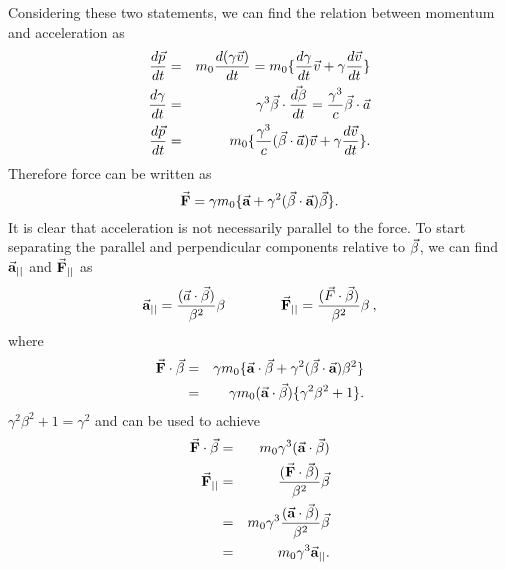 \documentclass{article}
\begin{document}
Considering these two statements, we can find the relation between momentum and acceleration as 
\begin{eqnarray}
    \frac{d \vec{p}}{d t} &=& m_0 \frac{d (\gamma \vec{v})}{d t} = m_0 \{  \frac{d \gamma}{d t}\vec{v} + \gamma \frac{d \vec{v}}{d t}  \} \\
    \frac{d \gamma}{d t} &=& \gamma^3 \vec{\beta} \cdot \vec{\frac{d \beta}{d t}} = \frac{\gamma^3}{c} \vec{\beta} \cdot \vec{a} \\
    \frac{d \vec{p}}{d t}  &=& m_0 \{   \frac{\gamma^3}{c} (\vec{\beta} \cdot \vec{a} )\vec{v} + \gamma \frac{d \vec{v}}{d t}  \} .
\end{eqnarray}
Therefore force can be written as
\begin{equation} \label{eq:Frel}
    \vec{\textbf{F}}  = \gamma m_0 \{ \vec{\textbf{a}} + \gamma^2(\vec{\beta} \cdot \vec{\textbf{a}})\vec{\beta} \} .
\end{equation}
It is clear that acceleration is not necessarily parallel to the force. 
To start separating the parallel and perpendicular components relative to $\vec{\beta}$, we can find $\vec{\textbf{a}}_{||}$ and $\vec{\textbf{F}}_{||}$ as
\begin{equation} \label{eq:a_F_parallels}
    \begin{aligned}
        \vec{\textbf{a}}_{||} = \frac{(\vec{a} \cdot \vec{\beta})}{\beta^2}\beta 
    \end{aligned}
    \qquad \qquad
    \begin{aligned}
        \vec{\textbf{F}}_{||} = \frac{(\vec{F} \cdot \vec{\beta})}{\beta^2}\beta \: ,
    \end{aligned}
\end{equation}
where 
\begin{eqnarray}
    \vec{\textbf{F}} \cdot \vec{\beta} &=& \gamma m_0 \{ \vec{\textbf{a}} \cdot \vec{\beta} + \gamma^2(\vec{\beta} \cdot \vec{\textbf{a}})\beta^2 \} \\
                                &=& \gamma m_0 (\vec{\textbf{a}} \cdot \vec{\beta}) \{ \gamma^2\beta^2  + 1\} .
\end{eqnarray}
$\gamma^2 \beta^2 + 1 = \gamma^2 $ and  can be used to achieve
\begin{eqnarray}
    \vec{\textbf{F}} \cdot \vec{\beta} &=& m_0 \gamma^3 (\vec{\textbf{a}} \cdot \vec{\beta} ) \nonumber \\
    \vec{\textbf{F}}_{||} &=& \frac{(\vec{\textbf{F}} \cdot \vec{\beta})}{\beta^2} \vec{\beta} \nonumber \\
                        &=& m_0 \gamma^3 \frac{(\vec{\textbf{a}} \cdot \vec{\beta} )}{\beta^2} \vec{\beta} \nonumber \\
                        &=& m_0 \gamma^3 \vec{\textbf{a}}_{||} . \label{eq:Frel_parallel}
\end{eqnarray}
\end{document}
